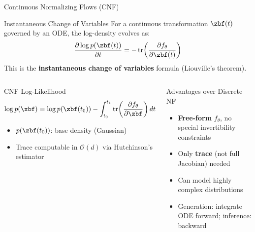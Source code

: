 \documentclass[aspectratio=169,xcolor=dvipsnames,svgnames,x11names,fleqn]{beamer}
\begin{document}
 
\begin{frame}{Continuous Normalizing Flows (CNF)}

\scriptsize

\begin{tblockFrost}{Instantaneous Change of Variables}
For a continuous transformation $\zbf(t)$ governed by an ODE, the log-density evolves as:
$$
  \frac{\partial \log p(\zbf(t))}{\partial t} = -\operatorname{tr}\!\left(\frac{\partial f_\theta}{\partial \zbf(t)}\right)
$$
This is the \textbf{instantaneous change of variables} formula (Liouville's theorem).
\end{tblockFrost}
\vspace{4pt}
\begin{columns}
\begin{block}{CNF Log-Likelihood}
$$
  \log p(\xbf) = \log p(\zbf(t_0)) - \int_{t_0}^{t_1} \operatorname{tr}\!\left(\frac{\partial f_\theta}{\partial \zbf}\right) dt
$$
\begin{itemize}
  \item $p(\zbf(t_0))$: base density (Gaussian)
  \item Trace computable in $\mathcal{O}(d)$ via Hutchinson's estimator
\end{itemize}
\end{block}
\begin{golden}{Advantages over Discrete NF}
\begin{itemize}
  \item \textbf{Free-form} $f_\theta$, no special invertibility constraints
  \item Only \textbf{trace} (not full Jacobian) needed
  \item Can model highly complex distributions
  \item Generation: integrate ODE forward; inference: backward
\end{itemize}
\end{golden}
\end{columns}
\end{frame}
 
\end{document}
